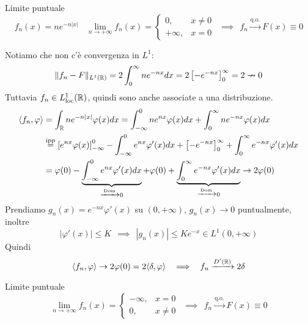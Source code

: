 Limite puntuale
\begin{equation*}
f_{n} (x) = ne^{- n|x|} \ \ \ \ \lim\limits_{n\rightarrow + \infty} f_{n}(x) =
\begin{cases}
0, & x\neq 0\\
+ \infty, & x = 0
\end{cases} \ \ \implies \ \ f_{n}\xrightarrow{\text{q.o.}} F(x) \equiv 0
\end{equation*}

Notiamo che non c'è convergenza in $L^{1}$:
\begin{equation*}
\Vert f_{n} - F\Vert_{L^{1}(\mathbb{R})} = 2\int^{\infty}_{0} ne^{- nx} dx = 2\left[ - e^{- nx}\right]^{\infty}_{0} = 2\nrightarrow 0
\end{equation*}
Tuttavia $f_{n} \in L^{1}_{\operatorname{loc}}(\mathbb{R})$, quindi sono anche associate a una distribuzione.
\begin{equation*}
\begin{aligned}
\langle f_{n}, \varphi \rangle & = \int_{\mathbb{R}} ne^{- n| x|} \varphi (x) dx = \int^{0}_{- \infty} ne^{nx} \varphi (x) dx + \int^{\infty}_{0} ne^{- nx} \varphi (x) dx\\
 & \overset{\text{ipp}}{=}\left[ e^{nx} \varphi (x)\right]^{0}_{- \infty} - \int^{0}_{- \infty} e^{nx} \varphi '(x) dx + \left[ - e^{- nx}\right]^{\infty}_{0} + \int^{\infty}_{0} e^{- nx} \varphi '(x) dx\\
 & = \varphi (0) - \underbrace{\int^{0}_{- \infty} e^{nx} \varphi '(x) dx}_{\xrightarrow{\text{Dom}} 0} + \varphi (0) + \underbrace{\int^{\infty}_{0} e^{- nx} \varphi '(x) dx}_{\xrightarrow{\text{Dom}} 0}\rightarrow 2\varphi (0)
\end{aligned}
\end{equation*}
Prendiamo $g_{n}(x) = e^{- nx} \varphi '(x)$ su $(0, + \infty)$, $g_{n}(x)\rightarrow 0$ puntualmente, inoltre
\begin{equation*}
| \varphi '(x)| \leq K\ \ \implies \ \ | g_{n}(x)| \leq Ke^{- x} \in L^{1}(0, + \infty)
\end{equation*}
Quindi
\begin{equation*}
\langle f_{n}, \varphi \rangle \rightarrow 2\varphi (0) = 2\langle \delta, \varphi \rangle \ \ \implies \ \ f_{n}\xrightarrow{D'(\mathbb{R})} 2\delta
\end{equation*}
\Soluzione

Limite puntuale
\begin{equation*}
\lim\limits_{n\rightarrow + \infty} f_{n}(x) =
\begin{cases}
- \infty, & x = 0\\
0, & x\neq 0
\end{cases} \ \ \implies \ \ f_{n}\xrightarrow{\text{q.o.}} F(x) \equiv 0
\end{equation*}

